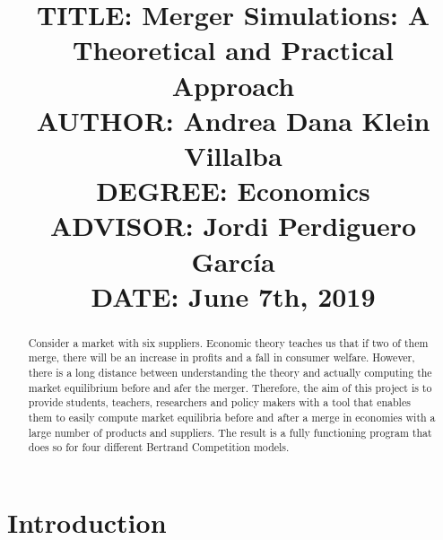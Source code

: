 \documentclass[12pt]{article}
\begin{document}

\title{{\large TITLE: Merger Simulations: A Theoretical and Practical Approach\\
AUTHOR: Andrea Dana Klein Villalba\\
DEGREE: Economics\\
ADVISOR: Jordi Perdiguero Garc\'ia\\
DATE: June 7th, 2019\\}}
\date{}

\clearpage\maketitle
\thispagestyle{empty}
\newpage

\begin{abstract}
Consider a market with six suppliers. Economic theory teaches us that if two of them merge, there will be an increase in profits and a fall in consumer welfare. However, there is a long distance between understanding the theory and actually computing the market equilibrium before and afer the merger. Therefore, the aim of this project is to provide students, teachers, researchers and policy makers with a tool that enables them to easily compute market equilibria before and after a merge in economies with a large number of products and suppliers. The result is a fully functioning program that does so for four different Bertrand Competition models. 
\end{abstract}
\newpage

 \tableofcontents
 \newpage

\section{Introduction}
\end{document}
